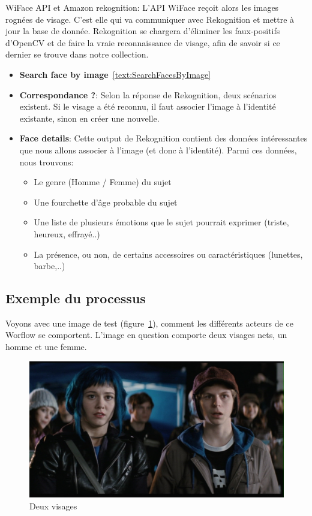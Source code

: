 WiFace API et Amazon rekognition:
L'API WiFace reçoit alors les images rognées de visage. 
C'est elle qui va communiquer avec Rekognition et mettre à jour la base de donnée.
Rekognition se chargera d'éliminer les faux-positifs d'OpenCV et de faire la vraie reconnaissance de visage,
afin de savoir si ce dernier se trouve dans notre collection.
\begin{itemize}
    \item \textbf{Search face by image}~\ref{text:SearchFacesByImage}
    \item \textbf{Correspondance ?}: Selon la réponse de Rekognition, deux scénarios existent. Si le visage a été reconnu, il faut associer l'image à l'identité existante, sinon en créer une nouvelle.
    \item \textbf{Face details}: Cette output de Rekognition contient des données intéressantes que nous allons associer à l'image (et donc à l'identité). Parmi ces données, nous trouvons:
    \begin{itemize}
        \item Le genre (Homme / Femme) du sujet
        \item Une fourchette d'âge probable du sujet
        \item Une liste de plusieurs émotions que le sujet pourrait exprimer (triste, heureux, effrayé..)
        \item La présence, ou non, de certains accessoires ou caractéristiques (lunettes, barbe,..)
    \end{itemize} 
\end{itemize} 

\subsection{Exemple du processus}
Voyons avec une image de test (figure~\ref{fig:scott}), comment les différents acteurs de ce Worflow se comportent.
L'image en question comporte deux visages nets, un homme et une femme.

\begin{figure}[H]
	\centering
	\includegraphics[width=12cm]{images/facial_reco/scott.jpg}
    \caption{Deux visages}
	\label{fig:scott}
\end{figure}

